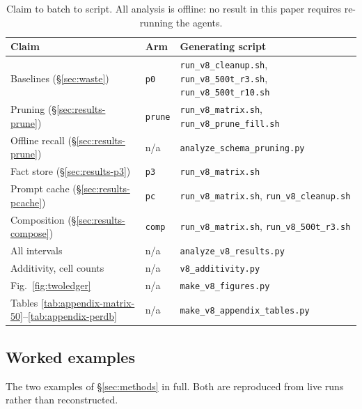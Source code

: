 \documentclass[conference]{IEEEtran}
\begin{document}
\begin{table}[t]
\caption{Claim to batch to script. All analysis is offline: no result in this
paper requires re-running the agents.}
\label{tab:appendix-repro}
\centering
\scriptsize
\begin{tabular}{@{}>{\raggedright\arraybackslash}p{1.75cm}>{\raggedright\arraybackslash}p{1.0cm}>{\raggedright\arraybackslash}p{4.3cm}@{}}
\toprule
Claim & Arm & Generating script \\
\midrule
Baselines (§\ref{sec:waste}) & \texttt{p0} &
\texttt{run\_v8\_cleanup.sh}, \texttt{run\_v8\_500t\_r3.sh},
\texttt{run\_v8\_500t\_r10.sh} \\
Pruning (§\ref{sec:results-prune}) & \texttt{prune} &
\texttt{run\_v8\_matrix.sh}, \texttt{run\_v8\_prune\_fill.sh} \\
Offline recall (§\ref{sec:results-prune}) & n/a &
\texttt{analyze\_schema\_pruning.py} \\
Fact store (§\ref{sec:results-p3}) & \texttt{p3} &
\texttt{run\_v8\_matrix.sh} \\
Prompt cache (§\ref{sec:results-pcache}) & \texttt{pc} &
\texttt{run\_v8\_matrix.sh}, \texttt{run\_v8\_cleanup.sh} \\
Composition (§\ref{sec:results-compose}) & \texttt{comp} &
\texttt{run\_v8\_matrix.sh}, \texttt{run\_v8\_500t\_r3.sh} \\
\midrule
All intervals & n/a & \texttt{analyze\_v8\_results.py} \\
Additivity, cell counts & n/a & \texttt{v8\_additivity.py} \\
Fig.~\ref{fig:twoledger} & n/a & \texttt{make\_v8\_figures.py} \\
Tables \ref{tab:appendix-matrix-50}--\ref{tab:appendix-perdb} & n/a &
\texttt{make\_v8\_appendix\_tables.py} \\
\bottomrule
\end{tabular}
\end{table}

\subsection*{Worked examples}

The two examples of §\ref{sec:methods} in full. Both are reproduced from live
runs rather than reconstructed.
\end{document}
